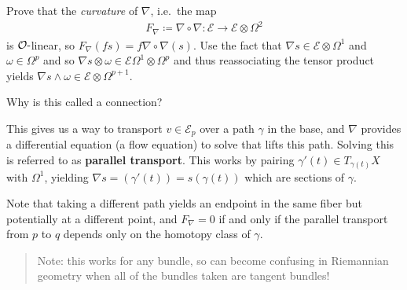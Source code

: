 \begin{exercise}[?]

Prove that the \emph{curvature} of \(\nabla\), i.e.~the map
\begin{align*}
F_{\nabla} \coloneqq\nabla \circ \nabla: \mathcal{E}\to \mathcal{E}\otimes\Omega^2  
\end{align*}
is \({\mathcal{O}}{\hbox{-}}\)linear, so
\(F_{\nabla}(fs) = f\nabla \circ \nabla(s)\). Use the fact that
\(\nabla s \in \mathcal{E}\otimes\Omega^1\) and \(\omega \in \Omega^p\)
and so
\(\nabla s \otimes \omega \in \mathcal{E} \Omega^1 \otimes \Omega^p\)
and thus reassociating the tensor product yields
\(\nabla s \wedge \omega \in \mathcal{E}\otimes\Omega^{p+1}\).

\end{exercise}

\begin{remark}

Why is this called a connection?

\begin{figure}
\centering
{}
\end{figure}

This gives us a way to transport \(v\in \mathcal{E}_p\) over a path
\(\gamma\) in the base, and \(\nabla\) provides a differential equation
(a flow equation) to solve that lifts this path. Solving this is
referred to as \textbf{parallel transport}. This works by pairing
\(\gamma'(t) \in T_{ \gamma(t) } X\) with \(\Omega^1\), yielding
\(\nabla s = ( \gamma'(t)) = s( \gamma(t))\) which are sections of
\(\gamma\).

Note that taking a different path yields an endpoint in the same fiber
but potentially at a different point, and \(F_\nabla = 0\) if and only
if the parallel transport from \(p\) to \(q\) depends only on the
homotopy class of \(\gamma\).

\begin{quote}
Note: this works for any bundle, so can become confusing in Riemannian
geometry when all of the bundles taken are tangent bundles!
\end{quote}

\end{remark}

